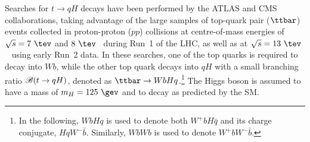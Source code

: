 Searches for $t \to qH$ decays have been performed by the ATLAS and CMS collaborations, taking advantage of the large samples
of top-quark pair ($\ttbar$) events collected in proton-proton ($pp$) collisions at centre-of-mass energies of $\sqrt{s}=7~\tev$ and $8~\tev$~\cite{Aad:2014dya,Aad:2015pja,Khachatryan:2016atv} during Run~1 of the LHC, as well as at $\sqrt{s}=13~\tev$~\cite{fcnc36} using early Run~2 data.
In these searches, one of the top quarks is required to decay into $Wb$, while the other top quark decays into $qH$ with a small branching ratio 
 $\mathscr{B}(t\to qH)$, denoted as $\ttbar \to WbHq$.\footnote{In the following, $WbHq$ is used to denote both $W^+b H\bar{q}$ and its charge conjugate, $HqW^- \bar{b}$. Similarly, 
$WbWb$ is used to denote $W^+b W^- \bar{b}$.}  The Higgs boson is assumed to have a mass of $m_H=125~\gev$ and to decay as predicted by
the SM.
